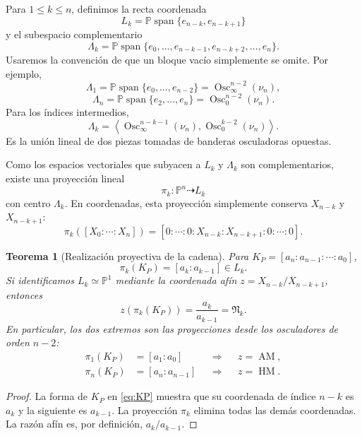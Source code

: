 \documentclass[11pt,oneside]{scrartcl}
\theoremstyle{plainblue}
\newtheorem{theorem}{Teorema}[section]
\theoremstyle{definitionblue}
\theoremstyle{remarkgray}
\newcommand{\PP}{\mathbb{P}}
\newcommand{\Osc}{\operatorname{Osc}}
\newcommand{\Span}{\operatorname{span}}
\newcommand{\AM}{\operatorname{AM}}
\newcommand{\HM}{\operatorname{HM}}
\newcommand{\cN}{\mathfrak{N}}
\begin{document}
Para \(1\le k\le n\), definimos la recta coordenada
\begin{equation}\label{eq:Lk}
L_k=\PP\Span\{e_{n-k},e_{n-k+1}\}
\end{equation}
y el subespacio complementario
\begin{equation}\label{eq:Lambdak}
\Lambda_k=
\PP\Span\{e_0,\dots,e_{n-k-1},e_{n-k+2},\dots,e_n\}.
\end{equation}
Usaremos la convención de que un bloque vacío simplemente se omite. Por ejemplo,
\[
\Lambda_1=\PP\Span\{e_0,\dots,e_{n-2}\}=\Osc_\infty^{n-2}(\nu_n),
\]
\[
\Lambda_n=\PP\Span\{e_2,\dots,e_n\}=\Osc_0^{n-2}(\nu_n).
\]
Para los índices intermedios,
\begin{equation}\label{eq:center-flags}
\Lambda_k=
\left\langle
\Osc_\infty^{n-k-1}(\nu_n),
\Osc_0^{k-2}(\nu_n)
\right\rangle.
\end{equation}
Es la unión lineal de dos piezas tomadas de banderas osculadoras opuestas.

Como los espacios vectoriales que subyacen a \(L_k\) y \(\Lambda_k\) son
complementarios, existe una proyección lineal
\[
\pi_k:\PP^n\dashrightarrow L_k
\]
con centro \(\Lambda_k\). En coordenadas, esta proyección simplemente conserva
\(X_{n-k}\) y \(X_{n-k+1}\):
\begin{equation}\label{eq:pik}
\pi_k([X_0:\cdots:X_n])
=[0:\cdots:0:X_{n-k}:X_{n-k+1}:0:\cdots:0].
\end{equation}

\begin{theorem}[Realización proyectiva de la cadena]\label{thm:projective-chain}
Para \(K_P=[a_n:a_{n-1}:\cdots:a_0]\),
\begin{equation}\label{eq:pikKP}
\pi_k(K_P)=[a_k:a_{k-1}]\in L_k.
\end{equation}
Si identificamos \(L_k\simeq\PP^1\) mediante la coordenada afín
\(z=X_{n-k}/X_{n-k+1}\), entonces
\begin{equation}\label{eq:pik-coordinate}
z(\pi_k(K_P))=\frac{a_k}{a_{k-1}}=\cN_k.
\end{equation}
En particular, los dos extremos son las proyecciones desde los osculadores de orden
\(n-2\):
\begin{align}
\pi_1(K_P)&=[a_1:a_0] &&\Longrightarrow&& z=\AM,\label{eq:proj-AM}\\
\pi_n(K_P)&=[a_n:a_{n-1}] &&\Longrightarrow&& z=\HM.\label{eq:proj-HM}
\end{align}
\end{theorem}

\begin{proof}
La forma de \(K_P\) en \cref{eq:KP} muestra que su coordenada de índice \(n-k\) es
\(a_k\) y la siguiente es \(a_{k-1}\). La proyección \(\pi_k\) elimina todas las
demás coordenadas. La razón afín es, por definición, \(a_k/a_{k-1}\).
\end{proof}
\end{document}
